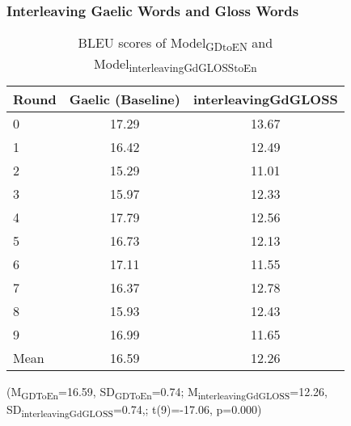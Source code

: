 \documentclass[a4paper]{article}
\begin{document}
\subsubsection{Interleaving Gaelic Words and Gloss Words}\label{treatment:Interleaving}
\begin{table}[ht]
\centering
\begin{tabular}{lcc}
  \hline
Round & Gaelic (Baseline) & interleavingGdGLOSS \\ 
  \hline
0 & 17.29 & 13.67 \\ 
  1 & 16.42 & 12.49 \\ 
  2 & 15.29 & 11.01 \\ 
  3 & 15.97 & 12.33 \\ 
  4 & 17.79 & 12.56 \\ 
  5 & 16.73 & 12.13 \\ 
  6 & 17.11 & 11.55 \\ 
  7 & 16.37 & 12.78 \\ 
  8 & 15.93 & 12.43 \\ 
  9 & 16.99 & 11.65 \\ 
   \hline
Mean & 16.59 & 12.26 \\ 
   \hline
\end{tabular}
\caption{BLEU scores of Model\textsubscript{GDtoEN} and Model\textsubscript{interleavingGdGLOSStoEn}} 
\label{Table:interleavingGdGLOSS}
\end{table}(M\textsubscript{GDToEn}=16.59, SD\textsubscript{GDToEn}=0.74; M\textsubscript{interleavingGdGLOSS}=12.26, SD\textsubscript{interleavingGdGLOSS}=0.74,; t(9)=-17.06, p=0.000)

\end{document}

